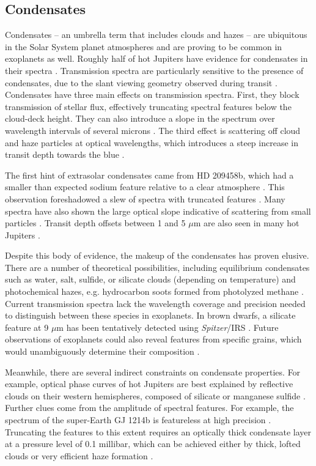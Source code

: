 \documentclass[graybox,natbib,nosecnum]{svmult}
\newcommand{\project}[1]{\textsl{#1}}
\newcommand{\Spitzer}{\project{Spitzer}}
\begin{document}
\subsection{Condensates}
Condensates -- an umbrella term that includes clouds and hazes -- are ubiquitous in the Solar System planet atmospheres and are proving to be common in exoplanets as well. Roughly half of hot Jupiters have evidence for condensates in their spectra \citep{sing16}. Transmission spectra are particularly sensitive to the presence of condensates, due to the slant viewing geometry observed during transit \citep{fortney05}.  Condensates have three main effects on transmission spectra.  First, they block transmission of stellar flux, effectively truncating spectral features below the cloud-deck height.  They can also introduce a slope in the spectrum over wavelength intervals of several microns \citep[e.g][]{sing16}.  The third effect is scattering off cloud and haze particles at optical wavelengths, which introduces a steep increase in transit depth towards the blue \citep[e.g.][]{pont08}.

The first hint of extrasolar condensates came from HD 209458b, which had a smaller than expected sodium feature relative to a clear atmosphere \citep{charbonneau02}. This observation foreshadowed a slew of spectra with truncated features \citep[e.g.][]{deming13, crossfield13, kreidberg14a, knutson14a, kreidberg15b}. Many spectra have also shown the large optical slope indicative of scattering from small particles \citep[e.g][]{lecavelier08b, sing11, sing13, robinson14, dragomir15}. Transit depth offsets between 1 and 5 $\mu$m are also seen in many hot Jupiters \citep{sing16}.

Despite this body of evidence, the makeup of the condensates has proven elusive. There are a number of theoretical possibilities, including equilibrium condensates such as water, salt, sulfide, or silicate clouds (depending on temperature) and photochemical hazes, e.g. hydrocarbon soots formed from photolyzed methane \citep{burrows99, kempton12, morley13, wakeford17}. Current transmission spectra lack the wavelength coverage and precision needed to distinguish between these species in exoplanets.  In brown dwarfs, a silicate feature at 9 $\mu$m has been tentatively detected using \Spitzer/IRS \citep{cushing06}. Future observations of exoplanets could also reveal features from specific grains, which would unambiguously determine their composition \citep{wakeford15}.

Meanwhile, there are several indirect constraints on condensate properties.  For example, optical phase curves of hot Jupiters are best explained by reflective clouds on their western hemispheres, composed of silicate or manganese sulfide \citep{demory13, oreshenko16, parmentier16}. Further clues come from the amplitude of spectral features. For example, the spectrum of the super-Earth GJ 1214b is featureless at high precision \citep[30 ppm,][]{kreidberg14a}.  Truncating the features to this extent requires an optically thick condensate layer at a pressure level of 0.1 millibar, which can be achieved either by thick, lofted clouds or very efficient haze formation \citep{morley15}. 
\end{document}
